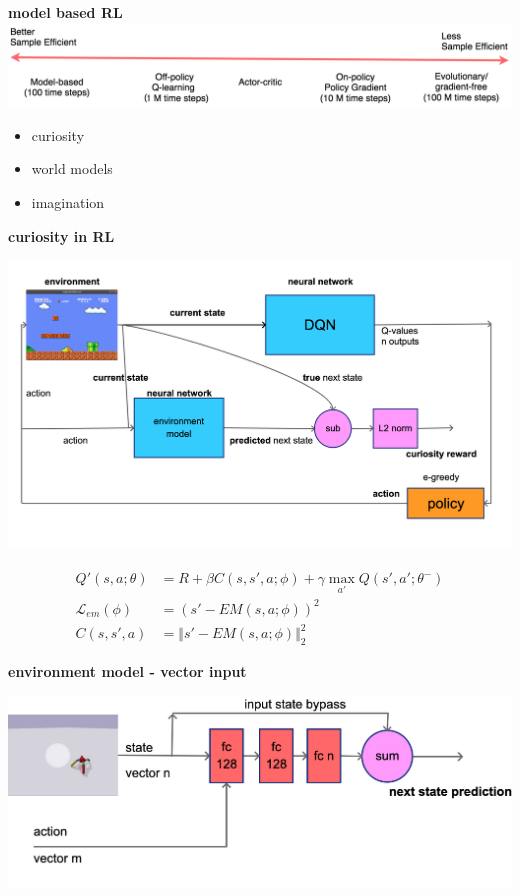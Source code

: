 \documentclass[xcolor=dvipsnames]{beamer}
\begin{document}
\begin{frame}{\bf model based RL}
  \centering
  {\centering \includegraphics[scale=0.22]{../images/samples.png}}

  \begin{itemize}
    \item curiosity
    \item world models
    \item imagination
  \end{itemize}

\end{frame}


\begin{frame}{\bf curiosity in RL}

  {\centering \includegraphics[scale=0.12]{../diagrams/dqncuriosity.png}}

  \begin{align*}
      Q'(s, a; \theta) &= R + \beta C(s, s', a; \phi) + \gamma \max \limits_{a'} Q(s', a'; \theta^-) \\
      \mathcal{L}_{em}(\phi) &= \left( s' - EM(s, a; \phi)  \right)^2 \\
      C(s, s', a) &= \Vert s' - EM(s, a; \phi) \Vert ^2_2
  \end{align*}

\end{frame}

\begin{frame}{\bf environment model - vector input}

  {\centering \includegraphics[scale=0.22]{../diagrams/fccuriositydetail.png}}

\end{frame}
\end{document}
